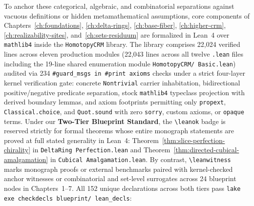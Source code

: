 To anchor these categorical, algebraic, and combinatorial separations against vacuous definitions or hidden metamathematical assumptions, core components of Chapters~\ref{ch:foundations}, \ref{ch:delta-rings}, \ref{ch:base-fiber}, \ref{ch:higher-crm}, \ref{ch:realizability-sites}, and~\ref{ch:sets-residuum} are formalized in Lean~4 over \texttt{mathlib4} inside the \texttt{HomotopyCRM} library. The library comprises 22,024 verified lines across eleven production modules (22,043 lines across all twelve \texttt{.lean} files including the 19-line shared enumeration module \texttt{HomotopyCRM/ Basic.lean}) audited via 234 \texttt{\#guard\_msgs in \#print axioms} checks under a strict four-layer kernel verification gate: concrete \texttt{Nontrivial} carrier inhabitation, bidirectional positive/negative predicate separation, stock \texttt{mathlib4} typeclass projection with derived boundary lemmas, and axiom footprints permitting only \texttt{propext}, \texttt{Classical.choice}, and \texttt{Quot.sound} with zero \texttt{sorry}, custom axioms, or \texttt{opaque} terms. Under our \textbf{Two-Tier Blueprint Standard}, the \texttt{\textbackslash leanok} badge is reserved strictly for formal theorems whose entire monograph statements are proved at full stated generality in Lean~4: Theorem~\ref{thm:slice-perfection-chirality} in \texttt{DeltaRing Perfection.lean} and Theorem~\ref{thm:directed-cubical-amalgamation} in \texttt{Cubical Amalgamation.lean}. By contrast, \texttt{\textbackslash leanwitness} marks monograph proofs or external benchmarks paired with kernel-checked anchor witnesses or combinatorial and set-level surrogates across 24 blueprint nodes in Chapters~1--7. All 152 unique declarations across both tiers pass \texttt{lake exe checkdecls blueprint/ lean\_decls}:
